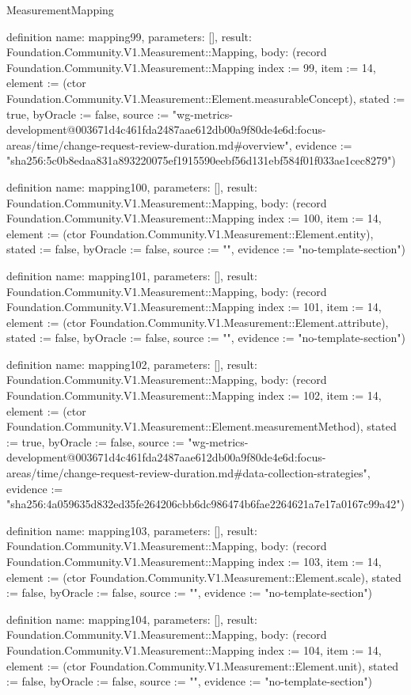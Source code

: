\begin{lexlean}{MeasurementMapping}
\begin{semanticmodule}
definition{
  name: mapping99,
  parameters: [],
  result: Foundation.Community.V1.Measurement::Mapping,
  body: (record Foundation.Community.V1.Measurement::Mapping {index := 99, item := 14, element := (ctor Foundation.Community.V1.Measurement::Element.measurableConcept), stated := true, byOracle := false, source := "wg-metrics-development@003671d4c461fda2487aae612db00a9f80de4e6d:focus-areas/time/change-request-review-duration.md#overview", evidence := "sha256:5c0b8edaa831a893220075ef1915590eebf56d131ebf584f01f033ae1cec8279"})
}

definition{
  name: mapping100,
  parameters: [],
  result: Foundation.Community.V1.Measurement::Mapping,
  body: (record Foundation.Community.V1.Measurement::Mapping {index := 100, item := 14, element := (ctor Foundation.Community.V1.Measurement::Element.entity), stated := false, byOracle := false, source := "", evidence := "no-template-section"})
}

definition{
  name: mapping101,
  parameters: [],
  result: Foundation.Community.V1.Measurement::Mapping,
  body: (record Foundation.Community.V1.Measurement::Mapping {index := 101, item := 14, element := (ctor Foundation.Community.V1.Measurement::Element.attribute), stated := false, byOracle := false, source := "", evidence := "no-template-section"})
}

definition{
  name: mapping102,
  parameters: [],
  result: Foundation.Community.V1.Measurement::Mapping,
  body: (record Foundation.Community.V1.Measurement::Mapping {index := 102, item := 14, element := (ctor Foundation.Community.V1.Measurement::Element.measurementMethod), stated := true, byOracle := false, source := "wg-metrics-development@003671d4c461fda2487aae612db00a9f80de4e6d:focus-areas/time/change-request-review-duration.md#data-collection-strategies", evidence := "sha256:4a059635d832ed35fe264206cbb6dc986474b6fae2264621a7e17a0167c99a42"})
}

definition{
  name: mapping103,
  parameters: [],
  result: Foundation.Community.V1.Measurement::Mapping,
  body: (record Foundation.Community.V1.Measurement::Mapping {index := 103, item := 14, element := (ctor Foundation.Community.V1.Measurement::Element.scale), stated := false, byOracle := false, source := "", evidence := "no-template-section"})
}

definition{
  name: mapping104,
  parameters: [],
  result: Foundation.Community.V1.Measurement::Mapping,
  body: (record Foundation.Community.V1.Measurement::Mapping {index := 104, item := 14, element := (ctor Foundation.Community.V1.Measurement::Element.unit), stated := false, byOracle := false, source := "", evidence := "no-template-section"})
}


\end{semanticmodule}
\end{lexlean}

